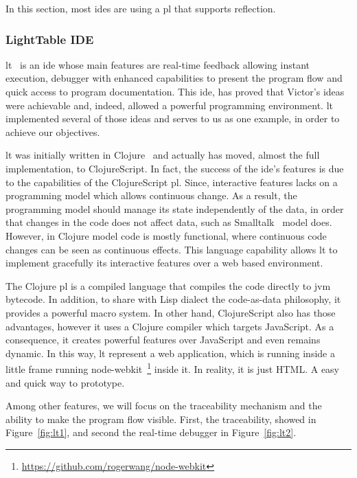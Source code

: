 In this section, most \ac{ide}s are using a \ac{pl} that supports reflection.

\subsubsection{LightTable IDE}
\label{sec:lt}

\ac{lt}~\cite{lighttable} is an \ac{ide} whose main features are real-time feedback allowing instant execution, debugger with enhanced capabilities to present the program flow and quick access to program documentation. This \ac{ide}, has proved that Victor's ideas~\cite{inventingPrin,learnableProg} were achievable and, indeed, allowed a powerful programming environment. \ac{lt} implemented several of those ideas and serves to us as one example, in order to achieve our objectives.

\ac{lt} was initially written in Clojure~\cite{hickey2008clojure} and actually has moved, almost the full implementation, to ClojureScript. In fact, the success of the \ac{ide}'s features is due to the capabilities of the ClojureScript \ac{pl}. Since, interactive features lacks on a programming model which allows continuous change. As a result, the programming model should manage its state independently of the data, in order that changes in the code does not affect data, such as Smalltalk~\cite{goldberg1983smalltalk} model does. However, in Clojure model code is mostly functional, where continuous code changes can be seen as continuous effects. This language capability allows \ac{lt} to implement gracefully its interactive features over a web based environment.

The Clojure \ac{pl} is a compiled language that compiles the code directly to \ac{jvm} bytecode. In addition, to share with Lisp dialect the code-as-data philosophy, it provides a powerful macro system. In other hand, ClojureScript also has those advantages, however it uses a Clojure compiler which targets JavaScript. As a consequence, it creates powerful features over JavaScript and even remains dynamic. In this way, \ac{lt} represent a web application, which is running inside a little frame running node-webkit~\footnote{\url{https://github.com/rogerwang/node-webkit}} inside it. In reality, it is just {\small HTML}. A easy and quick way to prototype.

Among other features, we will focus on the traceability mechanism and the ability to make the program flow visible. First, the traceability, showed in Figure~\ref{fig:lt1}, and second the real-time debugger in Figure~\ref{fig:lt2}.

